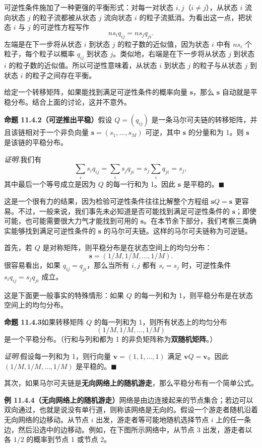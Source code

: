 \documentclass[UTF8,12pt,a4paper,fontset=fandol]{ctexart}
\begin{document}
可逆性条件施加了一种更强的平衡形式：对每一对状态 $i,j$（$i\ne j$），从状态 $i$ 流向状态 $j$ 的粒子流都被从状态 $j$ 流向状态 $i$ 的粒子流抵消。为看出这一点，把状态 $i$ 与 $j$ 的可逆性方程写作
\[
  ns_iq_{ij}=ns_jq_{ji}.
\]
左端是在下一步将从状态 $i$ 到状态 $j$ 的粒子数的近似值，因为状态 $i$ 中有 $ns_i$ 个粒子，每个粒子以概率 $q_{ij}$ 到状态 $j$。类似地，右端是在下一步将从状态 $j$ 到状态 $i$ 的粒子数的近似值。所以可逆性意味着，从状态 $i$ 到状态 $j$ 的粒子与从状态 $j$ 到状态 $i$ 的粒子之间存在平衡。

给定一个转移矩阵，如果能找到满足可逆性条件的概率向量 $\mathbf s$，那么 $\mathbf s$ 自动就是平稳分布。结合上面的讨论，这并不意外。

\noindent\textbf{命题 11.4.2（可逆推出平稳）}\quad 假设 $Q=(q_{ij})$ 是一条马尔可夫链的转移矩阵，并且该链相对于一个非负向量 $\mathbf s=(s_1,\ldots,s_M)$ 可逆，其中 $\mathbf s$ 的分量和为 1。则 $\mathbf s$ 是该链的平稳分布。

\noindent\textit{证明.}\quad 我们有
\[
  \sum_i s_iq_{ij}=\sum_i s_jq_{ji}=s_j\sum_i q_{ji}=s_j,
\]
其中最后一个等号成立是因为 $Q$ 的每一行和为 1。因此 $\mathbf s$ 是平稳的。$\blacksquare$

这是一个很有力的结果，因为检验可逆性条件往往比解整个方程组 $\mathbf sQ=\mathbf s$ 更容易。不过，一般来说，我们事先未必知道是否可能找到满足可逆性条件的 $\mathbf s$；即使可能，也可能需要很大力气才能找到可用的 $\mathbf s$。在本节余下部分，我们考察三类确实能够找到满足可逆性条件的 $\mathbf s$ 的马尔可夫链。这样的马尔可夫链称为可逆链。

首先，若 $Q$ 是对称矩阵，则平稳分布是在状态空间上的均匀分布：
\[
  \mathbf s=(1/M,1/M,\ldots,1/M).
\]
很容易看出，如果 $q_{ij}=q_{ji}$，那么当所有 $i,j$ 都有 $s_i=s_j$ 时，可逆性条件 $s_iq_{ij}=s_jq_{ji}$ 成立。

这是下面更一般事实的特殊情形：如果 $Q$ 的每一列和为 1，则平稳分布是在状态空间上的均匀分布。

\noindent\textbf{命题 11.4.3}\quad 如果转移矩阵 $Q$ 的每一列和为 1，则所有状态上的均匀分布
\[
  (1/M,1/M,\ldots,1/M)
\]
是一个平稳分布。（行和与列和都为 1 的非负矩阵称为\textbf{双随机矩阵}。）

\noindent\textit{证明.}\quad 假设每一列和为 1，则行向量 $\mathbf v=(1,1,\ldots,1)$ 满足 $\mathbf vQ=\mathbf v$。因此 $(1/M,1/M,\ldots,1/M)$ 是平稳的。$\blacksquare$

其次，如果马尔可夫链是\textbf{无向网络上的随机游走}，那么平稳分布有一个简单公式。

\noindent\textbf{例 11.4.4（无向网络上的随机游走）}\quad 网络是由边连接起来的节点集合；若边可以双向通过，也就是说没有单行道，则称该网络是无向的。假设一个游走者随机沿着无向网络的边移动。从节点 $i$ 出发，游走者等可能地随机选择节点 $i$ 上的任一条边，然后沿选中的边移动。例如，在下图所示网络中，从节点 3 出发，游走者以各 $1/2$ 的概率到节点 1 或节点 2。
\end{document}
